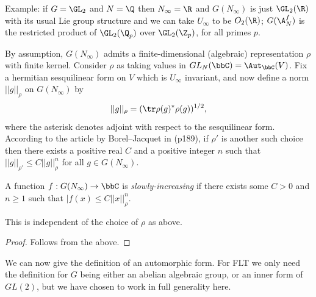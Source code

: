 Example: if $G=\GL_2$ and $N=\Q$ then $N_\infty=\R$ and $G(N_\infty)$ is just $\GL_2(\R)$ with its usual Lie group structure and we can take $U_\infty$ to be $O_2(\R)$; $G(\A_N^f)$ is the restricted product of $\GL_2(\Q_p)$ over $\GL_2(\Z_p)$, for all primes $p$.

By assumption, $G(N_\infty)$ admits a finite-dimensional (algebraic) representation $\rho$ with finite kernel. Consider $\rho$ as taking values in $GL_N(\bbC)=\Aut_{\bbC}(V)$. Fix a hermitian sesquilinear form on $V$ which
is $U_\infty$ invariant, and now define a norm $||g||_\rho$ on $G(N_\infty)$ by $$||g||_\rho=(\tr \rho(g)^*\rho(g))^{1/2},$$ where the asterisk denotes adjoint with respect to the sesquilinear form. According to the article by Borel--Jacquet in \cite{corvallis1} (p189), if $\rho'$ is another such choice then there exists a positive real $C$ and a positive integer $n$ such that $||g||_{\rho'}\leq C||g||_\rho^n$ for all $g\in G(N_\infty)$.

\begin{definition}\label{slowly_increasing}\notready A function $f : G(N_\infty)\to\bbC$ is \emph{slowly-increasing} if there exists some $C>0$
    and $n\geq1$ such that $|f(x)\leq C||x||_\rho^n$.
\end{definition}

\begin{theorem}\label{slowly_increasing_well_defined}\notready This is independent of the choice of $\rho$ as above.
\end{theorem}
\begin{proof} Follows from the above.
\end{proof}

We can now give the definition of an automorphic form. For FLT we only need the definition for $G$ being either an abelian algebraic group, or an inner form of $GL(2)$, but we have chosen to work in full generality here.

